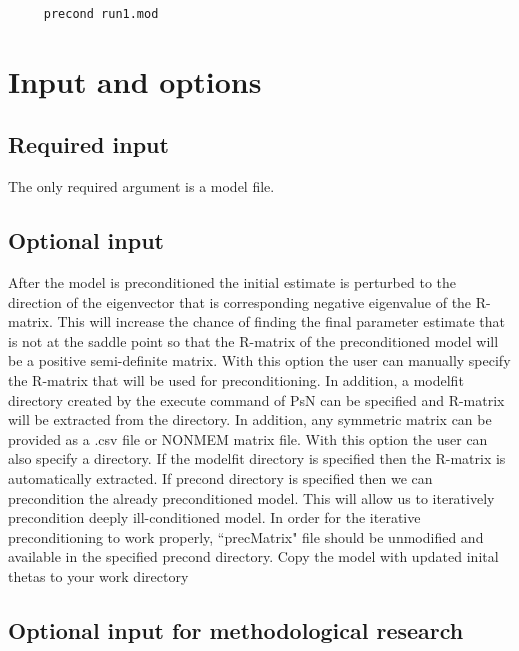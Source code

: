 \begin{verbatim}
     precond run1.mod
\end{verbatim}

\section{Input and options}

\subsection{Required input}
The only required argument is a model file.

\subsection{Optional input}

\begin{optionlist}
After the model is preconditioned the initial estimate is perturbed to the direction of the eigenvector that is corresponding negative eigenvalue of the R-matrix.  This will increase the chance of finding the final parameter estimate that is not at the saddle point so that the R-matrix of the preconditioned model will be a positive semi-definite matrix.
\nextopt
{}
With this option the user can manually specify the R-matrix that will be used for preconditioning.  In addition, a modelfit directory created by the execute command of PsN can be specified and R-matrix will be extracted from the directory.  In addition, any symmetric matrix can be provided as a .csv file or NONMEM matrix file.
\nextopt
{}
With this option the user can also specify a directory.  If the modelfit directory is specified then the R-matrix is automatically extracted.  If precond directory is specified then we can precondition the already preconditioned model.  This will allow us to iteratively precondition deeply ill-conditioned model.  In order for the iterative preconditioning to work properly, ``precMatrix" file should be unmodified and available in the specified precond directory.
\nextopt
{}
Copy the model with updated inital thetas to your work directory	
\nextopt
\end{optionlist}

\subsection{Optional input for methodological research}

